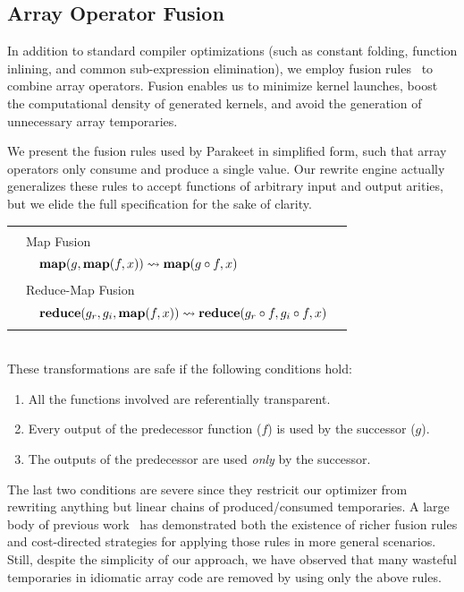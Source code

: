 \documentclass[preprint]{sigplanconf}
\begin{document}
\subsection{Array Operator Fusion}
In addition to standard compiler optimizations (such as constant folding,
function inlining, and common sub-expression elimination), we employ fusion
rules~\cite{Jones01} to combine array operators. Fusion enables us to minimize
kernel launches, boost the computational density of generated kernels, and
avoid the generation of unnecessary array temporaries.

We present the fusion rules used by Parakeet in simplified form, such that
array operators only consume and produce a single value. Our rewrite engine
actually generalizes these rules to accept functions of arbitrary input and
output arities, but we elide the full specification for the sake of clarity.
\\[5pt]
\begin{tabular}{|m{0.001cm} m{0.05cm} p{6.75cm} p{0.05cm} |}
  \hline 
  & &  & \\
  & \multicolumn{2}{l}{\large{Map Fusion} }  &  \\[2.5pt]
  & & $\mbox{\textbf{map}}(g, \mbox{\textbf{map}}(f, x)) \leadsto \mbox{\textbf{map}}(g \circ f, x)$ & \\
  & & & \\
  & \multicolumn{2}{l}{\large{Reduce-Map Fusion} }  & \\[2.5pt]
  & & $\mbox{\textbf{reduce}}(g_r, g_{i}, \mbox{\textbf{map}}(f, x)) \leadsto \mbox{\textbf{reduce}}(g_r \circ f, g_{i} \circ f, x)$ & \\
  & & & \\
  \hline
\end{tabular}\\[4pt]
These transformations are safe if the following conditions hold: 
\begin{enumerate}
\item All the functions involved are referentially transparent.

\item Every output of the predecessor function ($f$) is used by the successor
($g$).

\item The outputs of the predecessor are used \textit{only} by the successor.
\end{enumerate}
The last two conditions are severe since they restricit our optimizer from
rewriting anything but linear chains of produced/consumed temporaries. A large
body of previous work~\cite{Ald01} has demonstrated both the existence of
richer fusion rules and cost-directed strategies for applying those rules in
more general scenarios. Still, despite the simplicity of our approach, we have
observed that many wasteful temporaries in idiomatic array code are removed
by using only the above rules.
\end{document}
